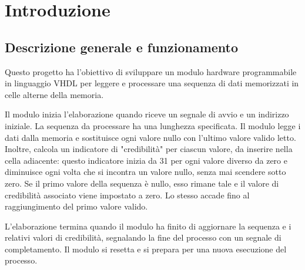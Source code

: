 \raggedright
\section{Introduzione}
\subsection{Descrizione generale e funzionamento}
\par Questo progetto ha l'obiettivo di sviluppare un modulo hardware programmabile in linguaggio VHDL per leggere e processare una sequenza di dati memorizzati in celle alterne della memoria.
\par Il modulo inizia l'elaborazione quando riceve un segnale di avvio e un indirizzo iniziale. 
  La sequenza da processare ha una lunghezza specificata. 
  Il modulo legge i dati dalla memoria e sostituisce ogni valore nullo con l'ultimo valore valido letto. Inoltre, calcola un indicatore di "credibilità" per ciascun valore, da inserire nella cella adiacente: questo indicatore inizia da 31 per ogni valore diverso da zero e diminuisce ogni volta che si incontra un valore nullo, senza mai scendere sotto zero. 
  Se il primo valore della sequenza è nullo, esso rimane tale e il valore di credibilità associato viene impostato a zero. Lo stesso accade fino al raggiungimento del primo valore valido.
\par L'elaborazione termina quando il modulo ha finito di aggiornare la sequenza e i relativi valori di credibilità, segnalando la fine del processo con un segnale di completamento. Il modulo si resetta e si prepara per una nuova esecuzione del processo.
